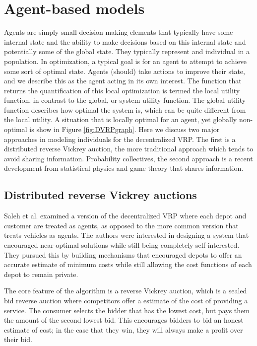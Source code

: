 \documentclass{sig-alternate}
\begin{document}
\section{Agent-based models}
Agents are simply small decision making elements that typically have some internal state and the ability to make decisions based on this internal state and potentially some of the global state. They typically represent and individual in a population. In optimization, a typical goal is for an agent to attempt to achieve some sort of optimal state. Agents (should) take actions to improve their state, and we describe this as the agent acting in its own interest. The function that returns the quantification of this local optimization is termed the local utility function, in contrast to the global, or system utility function. The global utility function describes how optimal the system is, which can be quite different from the local utility. A situation that is locally optimal for an agent, yet globally non-optimal is show in Figure \ref{fig:DVRPgraph}.
Here we discuss two major approaches in modeling individuals for the decentralized VRP. The first is a distributed reverse Vickrey auction, the more traditional approach which tends to avoid sharing information. Probability collectives, the second approach is a recent development from statistical physics and game theory that shares information. 

\subsection{Distributed reverse Vickrey auctions}

Saleh et al. \cite{Saleh:2012} examined a version of the decentralized VRP where each depot and customer are treated as agents, as opposed to the more common version that treats vehicles as agents. The authors were interested in designing a system that encouraged near-optimal solutions while still being completely self-interested. They pursued this by building mechanisms that encouraged depots to offer an accurate estimate of minimum costs while still allowing the cost functions of each depot to remain private. 

The core feature of the algorithm is a reverse Vickrey auction, which is a sealed bid reverse auction where competitors offer a estimate of the cost of providing a service. The consumer selects the bidder that has the lowest cost, but pays them the amount of the second lowest bid. This encourages bidders to bid an honest estimate of cost; in the case that they win, they will always make a profit over their bid.
\end{document}
